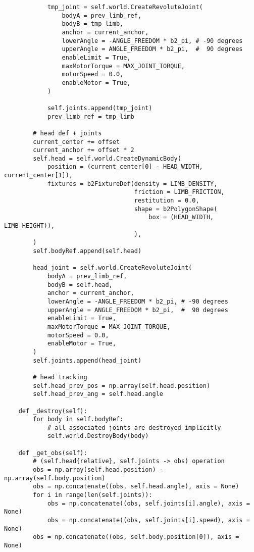 \begin{lstlisting}
            tmp_joint = self.world.CreateRevoluteJoint(
                bodyA = prev_limb_ref,
                bodyB = tmp_limb,
                anchor = current_anchor,
                lowerAngle = -ANGLE_FREEDOM * b2_pi, # -90 degrees
                upperAngle = ANGLE_FREEDOM * b2_pi,  #  90 degrees
                enableLimit = True,
                maxMotorTorque = MAX_JOINT_TORQUE,
                motorSpeed = 0.0,
                enableMotor = True,
            )

            self.joints.append(tmp_joint)
            prev_limb_ref = tmp_limb

        # head def + joints
        current_center += offset
        current_anchor += offset * 2
        self.head = self.world.CreateDynamicBody(
            position = (current_center[0] - HEAD_WIDTH, current_center[1]),
            fixtures = b2FixtureDef(density = LIMB_DENSITY,
                                    friction = LIMB_FRICTION,
                                    restitution = 0.0,
                                    shape = b2PolygonShape(
                                        box = (HEAD_WIDTH, LIMB_HEIGHT)),
                                    ),
        )
        self.bodyRef.append(self.head)

        head_joint = self.world.CreateRevoluteJoint(
            bodyA = prev_limb_ref,
            bodyB = self.head,
            anchor = current_anchor,
            lowerAngle = -ANGLE_FREEDOM * b2_pi, # -90 degrees
            upperAngle = ANGLE_FREEDOM * b2_pi,  #  90 degrees
            enableLimit = True,
            maxMotorTorque = MAX_JOINT_TORQUE,
            motorSpeed = 0.0,
            enableMotor = True,
        )
        self.joints.append(head_joint)

        # head tracking
        self.head_prev_pos = np.array(self.head.position)
        self.head_prev_ang = self.head.angle

    def _destroy(self):
        for body in self.bodyRef:
            # all associated joints are destroyed implicitly
            self.world.DestroyBody(body)

    def _get_obs(self):
        # (self.head{relative}, self.joints -> obs) operation
        obs = np.array(self.head.position) - np.array(self.body.position)
        obs = np.concatenate((obs, self.head.angle), axis = None)
        for i in range(len(self.joints)):
            obs = np.concatenate((obs, self.joints[i].angle), axis = None)
            obs = np.concatenate((obs, self.joints[i].speed), axis = None)
        obs = np.concatenate((obs, self.body.position[0]), axis = None)


\end{lstlisting}

